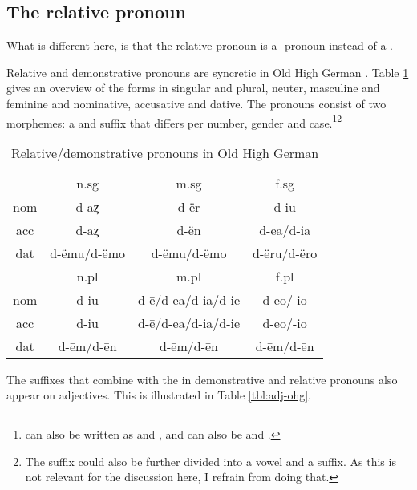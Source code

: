\subsection{The relative pronoun}

What is different here, is that the relative pronoun is a -pronoun instead of a .


Relative and demonstrative pronouns are syncretic in Old High German . Table \ref{tbl:rel-dem-ohg} gives an overview of the forms in singular and plural, neuter, masculine and feminine and nominative, accusative and dative. The pronouns consist of two morphemes: a  and suffix that differs per number, gender and case.\footnote{
 can also be written as  and ,  and  can also be  and  .
}\footnote{
The suffix could also be further divided into a vowel and a suffix. As this is not relevant for the discussion here, I refrain from doing that.
}

\begin{table}[htbp]
 \center
 \caption {Relative/demonstrative pronouns in Old High German }
  \begin{tabular}{cccc}
  \toprule
            & \ac{n}.\ac{sg}  & \ac{m}.\ac{sg}      & \ac{f}.\ac{sg}    \\
        \cmidrule{2-4}
  \ac{nom}  & d-aȥ            & d-ër                & d-iu               \\
  \ac{acc}  & d-aȥ            & d-ën                & d-ea/d-ia         \\
  \ac{dat}  & d-ëmu/d-ëmo     & d-ëmu/d-ëmo         & d-ëru/d-ëro       \\
  \bottomrule
            & \ac{n}.\ac{pl}  & \ac{m}.\ac{pl}      &  \ac{f}.\ac{pl}  \\
        \cmidrule{2-4}
  \ac{nom}  & d-iu            &  d-ē/d-ea/d-ia/d-ie & d-eo/-io         \\
  \ac{acc}  & d-iu            &  d-ē/d-ea/d-ia/d-ie & d-eo/-io         \\
  \ac{dat}  & d-ēm/d-ēn       &  d-ēm/d-ēn          & d-ēm/d-ēn        \\
    \bottomrule
  \end{tabular}
  \label{tbl:rel-dem-ohg}
\end{table}


The suffixes that combine with the  in demonstrative and relative pronouns also appear on adjectives. This is illustrated in Table \ref{tbl:adj-ohg}.


